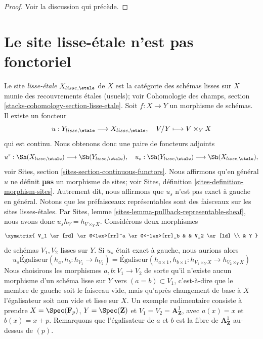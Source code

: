 \begin{proof}
Voir la discussion qui précède.
\end{proof}




\section{Le site lisse-\'etale n'est pas fonctoriel}
\label{section-lisse-etale-not-functorial}

\noindent
Le site {\it lisse-\'etale}
$X_{lisse,\etale}$ de $X$ est la catégorie des schémas lisses sur $X$
munie des recouvrements \'etales (usuels); voir
Cohomologie des champs, section \ref{stacks-cohomology-section-lisse-etale}.
Soit $f : X  \to Y$ un morphisme de schémas.
Il existe un foncteur
$$
u : Y_{lisse,\etale} \longrightarrow X_{lisse,\etale},\quad
V/Y \longmapsto V \times_Y X
$$
qui est continu. Nous obtenons donc une paire de foncteurs adjoints
$$
u^s :
\Sh(X_{lisse,\etale})
\longrightarrow
\Sh(Y_{lisse,\etale}),
\quad
u_s :
\Sh(Y_{lisse,\etale})
\longrightarrow
\Sh(X_{lisse,\etale}),
$$
voir Sites, section \ref{sites-section-continuous-functors}.
Nous affirmons qu'en général $u$ ne définit {\bf pas} un morphisme de sites; voir
Sites, définition \ref{sites-definition-morphism-sites}.
Autrement dit, nous affirmons que $u_s$ n'est pas exact à gauche en général. Notons que
les préfaisceaux représentables sont des faisceaux sur les sites lisses-\'etales. Par
Sites, lemme \ref{sites-lemma-pullback-representable-sheaf},
nous avons donc $u_sh_V = h_{V \times_Y X}$. Considérons deux morphismes
$$
\xymatrix{
V_1 \ar[rd] \ar@<1ex>[rr]^a \ar@<-1ex>[rr]_b & & V_2 \ar[ld] \\
& Y
}
$$
de schémas $V_1, V_2$ lisses sur $Y$. Si $u_s$ était exact à gauche, nous
aurions alors
$$
u_s \text{Égaliseur}(h_a, h_b : h_{V_1} \to h_{V_2})
=
\text{Égaliseur}(h_{a \times 1}, h_{b \times 1} :
h_{V_1 \times_Y X} \to h_{V_2 \times_Y X})
$$
Nous choisirons les morphismes $a, b : V_1 \to V_2$ de sorte qu'il n'existe
aucun morphisme d'un schéma lisse sur $Y$ vers $(a = b) \subset V_1$, c'est-à-dire
que le membre de gauche soit le faisceau vide, mais qu'après
changement de base à $X$ l'égalisateur soit non vide et lisse sur $X$.
Un exemple rudimentaire consiste à prendre $X = \Spec(\mathbf{F}_p)$,
$Y = \Spec(\mathbf{Z})$ et $V_1 = V_2 = \mathbf{A}^1_\mathbf{Z}$,
avec $a(x) = x$ et $b(x) = x + p$. Remarquons que l'égalisateur
de $a$ et $b$ est la fibre de $\mathbf{A}^1_\mathbf{Z}$ au-dessus de $(p)$.

